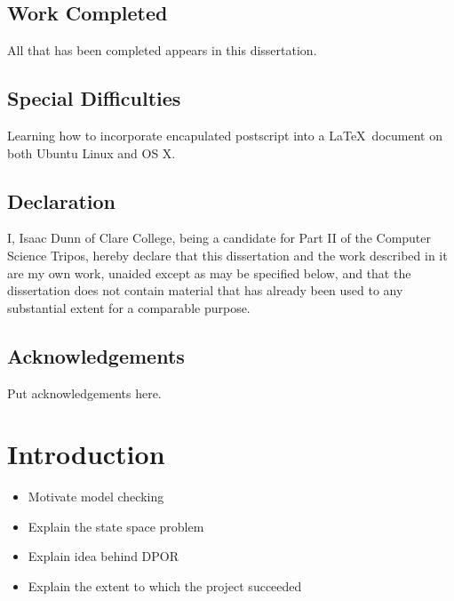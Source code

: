 \documentclass[12pt,a4paper,twoside,openright]{report}
\begin{document}
\section*{Work Completed}

All that has been completed appears in this dissertation.

\section*{Special Difficulties}

Learning how to incorporate encapulated postscript into a \LaTeX\
document on both Ubuntu Linux and OS X.
 
\newpage
\section*{Declaration}

I, Isaac Dunn of Clare College, being a candidate for Part II of the Computer
Science Tripos, hereby declare
that this dissertation and the work described in it are my own work,
unaided except as may be specified below, and that the dissertation
does not contain material that has already been used to any substantial
extent for a comparable purpose.

\bigskip
{}

\bigskip
{}

\tableofcontents

\listoffigures

\newpage
\section*{Acknowledgements}

Put acknowledgements here.


\pagestyle{headings}

\chapter{Introduction}

\begin{itemize}
	\item Motivate model checking
	\item Explain the state space problem
	\item Explain idea behind DPOR
	\item Explain the extent to which the project succeeded
\end{itemize}
\end{document}
